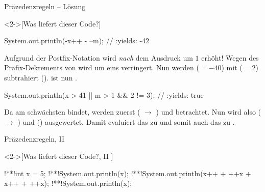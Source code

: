 \ifull
\begin{frame}[fragile,c]{Präzedenzregeln -- Lösung}
    \begin{solve}<2->[Was liefert dieser Code?]
        \pause{}\begin{plainjava}[columns={[c]fullflexible}]
System.out.println(-x++ - --m); // :yields: -42
        \end{plainjava}
        \pause{}Aufgrund der Postfix-Notation  wird  \emph{nach} dem Ausdruck um \(1\) erhöht!\pause{} Wegen des Präfix-Dekrements von  wird  um eins verringert.\pause{} Nun werden  (\(=-40\)) mit  (\(= 2\)) subtrahiert ().\pause{}  ist nun .
        \begin{plainjava}[columns={[c]fullflexible}]
System.out.println(x > 41 || m > 1 && 2 != 3); // :yields: true
        \end{plainjava}
        Da \bjava{||} am schwächsten bindet,\pause{} werden zuerst  ( \(\to\) ) und  betrachtet.\pause{} Nun wird also  ( \(\to\) ) und  () ausgewertet.\pause{} Damit evaluiert das  zu  und somit auch das  zu .
    \end{solve}
\end{frame}

\begin{frame}[fragile,c]{Präzedenzregeln, II}
\begin{exercise}<2->[Was liefert dieser Code?, II ]
    \begin{plainjava}[columns={[c]fullflexible}]
!**!int x = 5;
!**!System.out.println(x);
!**!System.out.println(x++ + ++x + x++ + ++x);
!**!System.out.println(x);
    \end{plainjava}
\end{exercise}
\end{frame}

